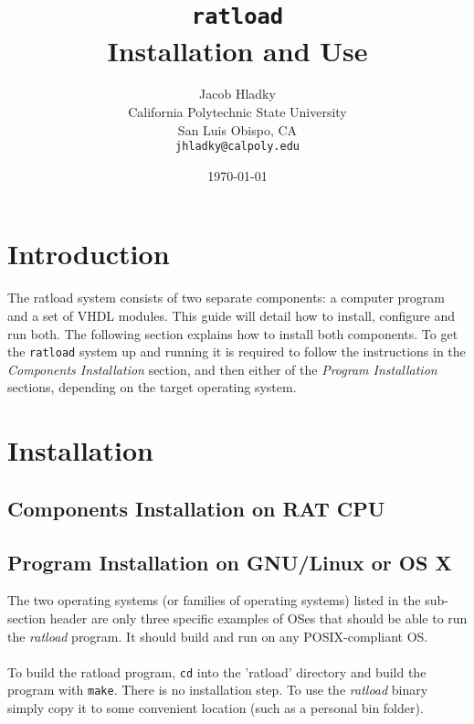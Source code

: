 \documentclass[titlepage]{article}
\begin{document}
\title{\huge{\texttt{ratload}\\ Installation and Use}}
\author{
  Jacob Hladky\\
  California Polytechnic State University\\
  San Luis Obispo, CA\\
  \texttt{jhladky@calpoly.edu}
}
\vfill
\date{\today}
\maketitle


\tableofcontents
\clearpage


\section{Introduction}
The ratload system consists of two separate components: a computer program and a set of VHDL modules. This guide will detail how to install, configure and run both. The following section explains how to install both components. To get the \texttt{ratload} system up and running it is required to follow the instructions in the \emph{Components Installation} section, and then either of the \emph{Program Installation} sections, depending on the target operating system.

\section{Installation}
\subsection{Components Installation on RAT CPU}
\subsection{Program Installation on GNU/Linux or OS X}
The two operating systems (or families of operating systems) listed in the sub-section header are only three specific examples of OSes that should be able to run the \emph{ratload} program. It should build and run on any POSIX-compliant OS.\\\\
To build the ratload program, \texttt{cd} into the 'ratload' directory and build the program with \texttt{make}. There is no installation step. To use the \emph{ratload} binary simply copy it to some convenient location (such as a personal bin folder).
\end{document}
